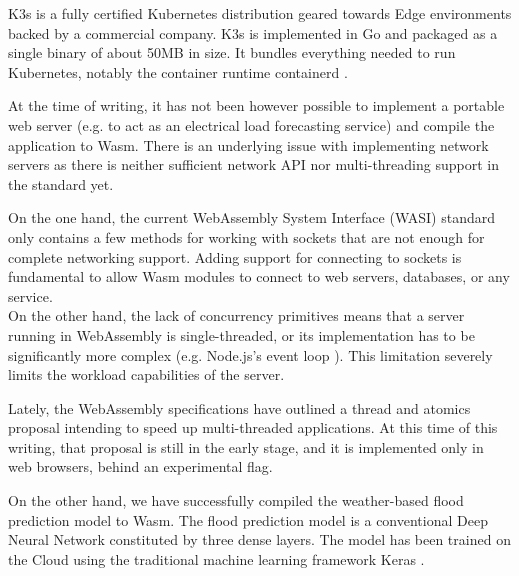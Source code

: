 K3s is a fully certified Kubernetes distribution geared towards Edge environments backed by a commercial company. K3s is implemented in Go and packaged as a single binary of about 50MB in size. It bundles everything needed to run Kubernetes, notably the container runtime containerd \cite{containerd}.

At the time of writing, it has not been however possible to implement a portable web server (e.g. to act as an electrical load forecasting service) and compile the application to Wasm. There is an underlying issue with implementing network servers as there is neither sufficient network API nor multi-threading support in the standard yet.

On the one hand, the current WebAssembly System Interface (WASI) standard only contains a few methods for working with sockets that are not enough for complete networking support. Adding support for connecting to sockets is fundamental to allow Wasm modules to connect to web servers, databases, or any service. \\
On the other hand, the lack of concurrency primitives means that a server running in WebAssembly is single-threaded, or its implementation has to be significantly more complex (e.g. Node.js's event loop \cite{nodejs-event-loop}). This limitation severely limits the workload capabilities of the server. 

Lately, the WebAssembly specifications have outlined a thread and atomics proposal intending to speed up multi-threaded applications. At this time of this writing, that proposal is still in the early stage, and it is implemented only in web browsers, behind an experimental flag.



On the other hand, we have successfully compiled the weather-based flood prediction model to Wasm. The flood prediction model is a conventional Deep Neural Network constituted by three dense layers. The model has been trained on the Cloud using the traditional machine learning framework Keras \cite{keras}.

